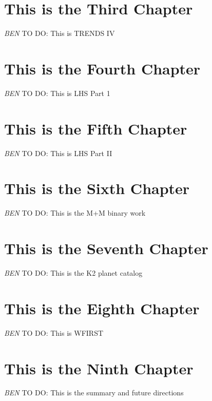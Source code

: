\documentclass[12pt]{caltech_thesis}
\newcommand{\todo}[3]{{\color{#2} \emph{#1} TO DO: #3}}
\newcommand{\btmtodo}[1]{\todo{BEN}{red}{#1}}
\begin{document}
\chapter{This is the Third Chapter}



\btmtodo{This is TRENDS IV}

\chapter{This is the Fourth Chapter}

\btmtodo{This is LHS Part 1}
\chapter{This is the Fifth Chapter}

\btmtodo{This is LHS Part II}

\chapter{This is the Sixth Chapter}

\btmtodo{This is the M+M binary work}

\chapter{This is the Seventh Chapter}

\btmtodo{This is the K2 planet catalog}

\chapter{This is the Eighth Chapter}
\label{chap:wfirst}

\btmtodo{This is WFIRST}

\chapter{This is the Ninth Chapter}

\btmtodo{This is the summary and future directions}

\printbibliography[heading=bibintoc]
%





\end{document}
